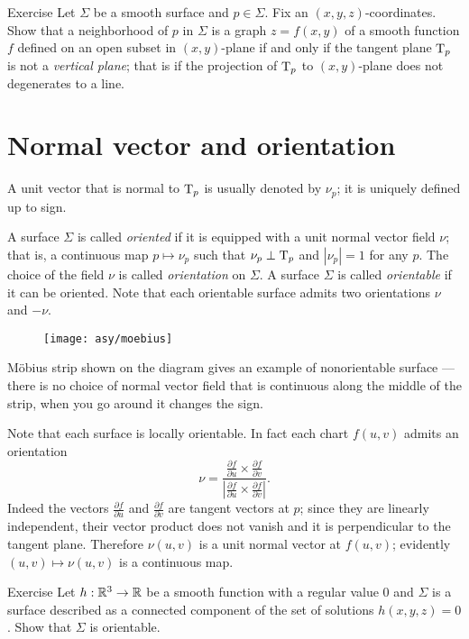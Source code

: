 \begin{thm}{Exercise}\label{ex:vertical-tangent}
Let $\Sigma$ be a smooth surface and $p\in\Sigma$.
Fix an $(x,y,z)$-coordinates.
Show that a neighborhood of $p$ in $\Sigma$ is a graph $z=f(x,y)$ of a smooth function $f$ defined on an open subset in $(x,y)$-plane if and only if the tangent plane $\mathrm{T}_p$ is not a \emph{vertical plane}; that is if the projection of $\mathrm{T}_p$ to $(x,y)$-plane does not degenerates to a line.
\end{thm}



\section*{Normal vector and orientation}
A unit vector that is normal to $\mathrm{T}_p$ is usually denoted by $\nu_p$;
it is uniquely defined up to sign.

A surface $\Sigma$ is called \emph{oriented} if it is equipped with a unit normal vector field $\nu$;
that is, a continuous map $p\mapsto \nu_p$ such that $\nu_p\perp\mathrm{T}_p$ and $|\nu_p|=1$ for any $p$.
The choice of the field $\nu$ is called \emph{orientation} on $\Sigma$.
A surface $\Sigma$ is called \emph{orientable} if it can be oriented.
Note that each orientable surface admits two orientations $\nu$ and $-\nu$. %

\begin{wrapfigure}{r}{40 mm}
\vskip-0mm
\centering
\texttt{[image: asy/moebius]}
\vskip0mm
\end{wrapfigure}

M\"obius strip shown on the diagram gives an example of nonorientable surface --- there is no choice of normal vector field that is continuous along the middle of the strip, 
when you go around it changes the sign.

Note that each surface is locally orientable.
In fact each chart $f(u,v)$ admits an orientation 
\[\nu=
\frac{\tfrac{\partial f}{\partial u}\times \tfrac{\partial f}{\partial v}}
{\left|\tfrac{\partial f}{\partial u}\times \tfrac{\partial f}{\partial v}\right|}.\]
Indeed the vectors $\tfrac{\partial f}{\partial u}$ and $\tfrac{\partial f}{\partial v}$ are tangent vectors at $p$; 
since they are linearly independent, their vector product does not vanish and it is perpendicular to the tangent plane.
Therefore $\nu(u,v)$ is a unit normal vector at $f(u,v)$;
evidently $(u,v)\mapsto \nu(u,v)$ is a continuous map. 

\begin{thm}{Exercise}
Let $h:\mathbb{R}^3\to\mathbb{R}$ be a smooth function with a regular value $0$ and $\Sigma$ is a surface described as a connected component of the set of solutions $h(x,y,z)=0$.
Show that $\Sigma$ is orientable.
\end{thm}

